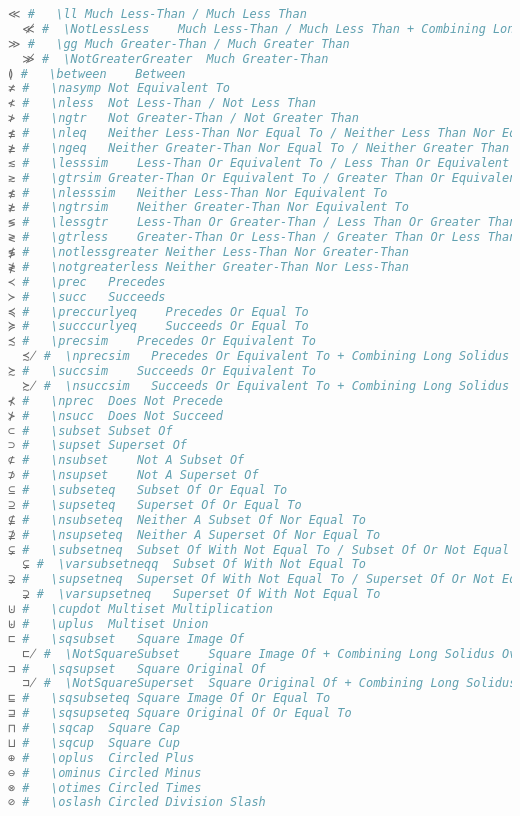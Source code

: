 \begin{lstlisting}[language=Julia, linewidth=\textwidth]
≪ #   \ll Much Less-Than / Much Less Than
  ≪̸ #  \NotLessLess    Much Less-Than / Much Less Than + Combining Long Solidus Overlay
≫ #   \gg Much Greater-Than / Much Greater Than
  ≫̸ #  \NotGreaterGreater  Much Greater-Than
≬ #   \between    Between
≭ #   \nasymp Not Equivalent To
≮ #   \nless  Not Less-Than / Not Less Than
≯ #   \ngtr   Not Greater-Than / Not Greater Than
≰ #   \nleq   Neither Less-Than Nor Equal To / Neither Less Than Nor Equal To
≱ #   \ngeq   Neither Greater-Than Nor Equal To / Neither Greater Than Nor Equal To
≲ #   \lesssim    Less-Than Or Equivalent To / Less Than Or Equivalent To
≳ #   \gtrsim Greater-Than Or Equivalent To / Greater Than Or Equivalent To
≴ #   \nlesssim   Neither Less-Than Nor Equivalent To
≵ #   \ngtrsim    Neither Greater-Than Nor Equivalent To
≶ #   \lessgtr    Less-Than Or Greater-Than / Less Than Or Greater Than
≷ #   \gtrless    Greater-Than Or Less-Than / Greater Than Or Less Than
≸ #   \notlessgreater Neither Less-Than Nor Greater-Than
≹ #   \notgreaterless Neither Greater-Than Nor Less-Than
≺ #   \prec   Precedes
≻ #   \succ   Succeeds
≼ #   \preccurlyeq    Precedes Or Equal To
≽ #   \succcurlyeq    Succeeds Or Equal To
≾ #   \precsim    Precedes Or Equivalent To
  ≾̸ #  \nprecsim   Precedes Or Equivalent To + Combining Long Solidus Overlay
≿ #   \succsim    Succeeds Or Equivalent To
  ≿̸ #  \nsuccsim   Succeeds Or Equivalent To + Combining Long Solidus Overlay
⊀ #   \nprec  Does Not Precede
⊁ #   \nsucc  Does Not Succeed
⊂ #   \subset Subset Of
⊃ #   \supset Superset Of
⊄ #   \nsubset    Not A Subset Of
⊅ #   \nsupset    Not A Superset Of
⊆ #   \subseteq   Subset Of Or Equal To
⊇ #   \supseteq   Superset Of Or Equal To
⊈ #   \nsubseteq  Neither A Subset Of Nor Equal To
⊉ #   \nsupseteq  Neither A Superset Of Nor Equal To
⊊ #   \subsetneq  Subset Of With Not Equal To / Subset Of Or Not Equal To
  ⊊︀ #  \varsubsetneqq  Subset Of With Not Equal To
⊋ #   \supsetneq  Superset Of With Not Equal To / Superset Of Or Not Equal To
  ⊋︀ #  \varsupsetneq   Superset Of With Not Equal To
⊍ #   \cupdot Multiset Multiplication
⊎ #   \uplus  Multiset Union
⊏ #   \sqsubset   Square Image Of
  ⊏̸ #  \NotSquareSubset    Square Image Of + Combining Long Solidus Overlay
⊐ #   \sqsupset   Square Original Of
  ⊐̸ #  \NotSquareSuperset  Square Original Of + Combining Long Solidus Overlay
⊑ #   \sqsubseteq Square Image Of Or Equal To
⊒ #   \sqsupseteq Square Original Of Or Equal To
⊓ #   \sqcap  Square Cap
⊔ #   \sqcup  Square Cup
⊕ #   \oplus  Circled Plus
⊖ #   \ominus Circled Minus
⊗ #   \otimes Circled Times
⊘ #   \oslash Circled Division Slash

\end{lstlisting}
